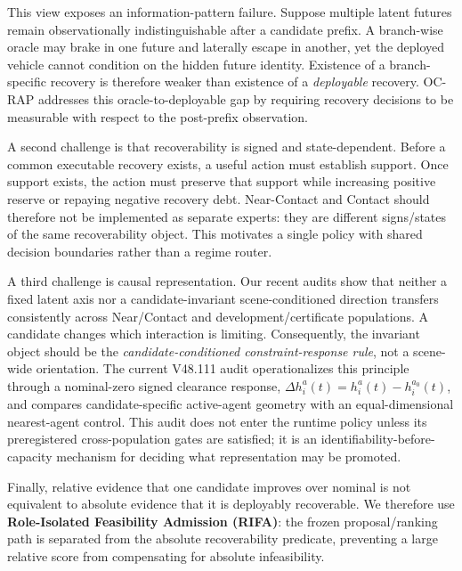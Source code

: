 \documentclass[conference]{IEEEtran}
\begin{document}
This view exposes an information-pattern failure. Suppose multiple latent futures remain observationally indistinguishable after a candidate prefix. A branch-wise oracle may brake in one future and laterally escape in another, yet the deployed vehicle cannot condition on the hidden future identity. Existence of a branch-specific recovery is therefore weaker than existence of a \emph{deployable} recovery. OC-RAP addresses this oracle-to-deployable gap by requiring recovery decisions to be measurable with respect to the post-prefix observation.

A second challenge is that recoverability is signed and state-dependent. Before a common executable recovery exists, a useful action must establish support. Once support exists, the action must preserve that support while increasing positive reserve or repaying negative recovery debt. Near-Contact and Contact should therefore not be implemented as separate experts: they are different signs/states of the same recoverability object. This motivates a single policy with shared decision boundaries rather than a regime router.

A third challenge is causal representation. Our recent audits show that neither a fixed latent axis nor a candidate-invariant scene-conditioned direction transfers consistently across Near/Contact and development/certificate populations. A candidate changes which interaction is limiting. Consequently, the invariant object should be the \emph{candidate-conditioned constraint-response rule}, not a scene-wide orientation. The current V48.111 audit operationalizes this principle through a nominal-zero signed clearance response, $\Delta h_i^a(t)=h_i^a(t)-h_i^{a_0}(t)$, and compares candidate-specific active-agent geometry with an equal-dimensional nearest-agent control. This audit does not enter the runtime policy unless its preregistered cross-population gates are satisfied; it is an identifiability-before-capacity mechanism for deciding what representation may be promoted.

Finally, relative evidence that one candidate improves over nominal is not equivalent to absolute evidence that it is deployably recoverable. We therefore use \textbf{Role-Isolated Feasibility Admission (RIFA)}: the frozen proposal/ranking path is separated from the absolute recoverability predicate, preventing a large relative score from compensating for absolute infeasibility.
\end{document}
